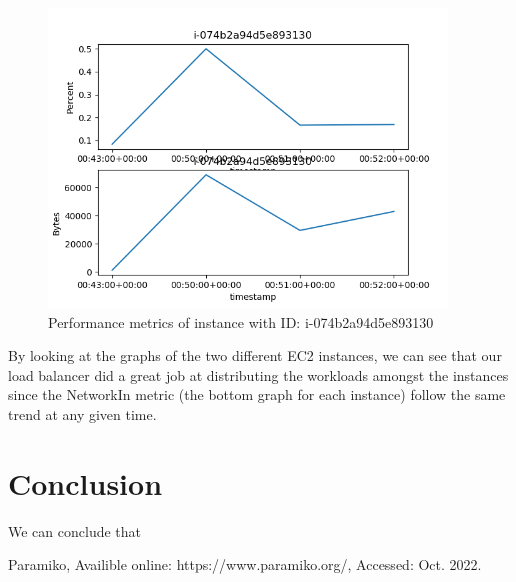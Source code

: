 \documentclass[12pt]{article}
\begin{document}
\begin{figure}[htbp]
\centering
  \includegraphics[height=300px]{i-074b2a94d5e893130.png}
  \caption{Performance metrics of instance with ID: i-074b2a94d5e893130}
\end{figure}

By looking at the graphs of the two different EC2 instances, we can see that our load balancer did a great job at distributing the workloads amongst the instances since the NetworkIn metric (the bottom graph for each instance) follow the same trend at any given time.

\section{Conclusion}

We can conclude that

\begin{thebibliography}{9}
Paramiko, Availible online: https://www.paramiko.org/, Accessed: Oct. 2022. 
\end{thebibliography}
\end{document}

